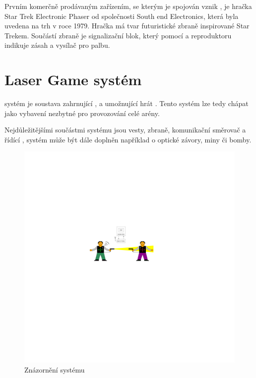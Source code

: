 Prvním komerčně prodávaným zařízením, se kterým je spojován vznik , je hračka Star Trek Electronic Phaser od společnosti South end Electronics, která byla uvedena na trh v roce 1979. Hračka má tvar futuristické zbraně inspirované Star Trekem. Součástí zbraně je signalizační blok, který pomocí  a reproduktoru indikuje zásah a  vysílač pro palbu.

\section{Laser Game systém}
 systém je soustava zahrnující ,  a  umožnující hrát . Tento systém lze tedy chápat jako vybavení nezbytné pro provozování celé arény.

Nejdůležitějšími součástmi  systému jsou vesty, zbraně, komunikační směrovač a řídící ,  systém může být dále doplněn například o optické závory, miny či bomby.

\begin{figure}[H]
    \begin{center}
        \includegraphics[width=\textwidth]{img/lgs}
    \end{center}
    \caption{Znázornění  systému}
\end{figure}


